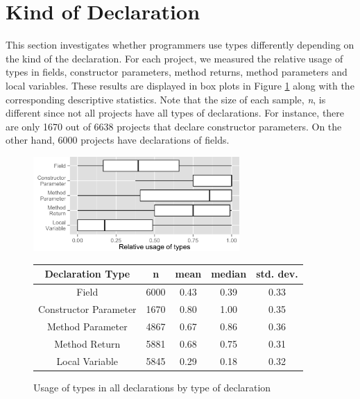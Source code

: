 \documentclass[msc]{ppgccufmg}
\renewcommand{\arraystretch}{1.2}
\begin{document}
\section{Kind of Declaration\label{sec:results-type}}
This section investigates whether programmers use types differently depending on the kind of the declaration.
For each project, we measured the relative usage of types in fields, constructor parameters, method returns, method parameters and local variables.
These results are displayed in box plots in Figure \ref{fig:all_boxplot_type} along with the corresponding descriptive statistics.
Note that the size of each sample, \emph{n}, is different since not all projects have all types of declarations. 
For instance, there are only 1670 out of 6638 projects that declare constructor parameters.
On the other hand, 6000 projects have declarations of fields.

\begin{figure}[h]
\centering 
\includegraphics[width=0.7\textwidth]{../aosd_2014/analysis/result/all/boxplots/6_declarations_by_type.png} 
\vspace{0.3cm}

\renewcommand{\arraystretch}{1.2}

\begin{tabular}{|c|c|c|c|c|}
\hline
Declaration Type		& n		& mean	& median		& std. dev.	\\
\hline
\hline
Field					& 6000	& 0.43	& 0.39		& 0.33		\\ \hline
Constructor Parameter	& 1670	& 0.80	& 1.00		& 0.35		\\ \hline
Method Parameter		& 4867	& 0.67	& 0.86		& 0.36		\\ \hline
Method Return			& 5881	& 0.68	& 0.75		& 0.31		\\ \hline
Local Variable			& 5845	& 0.29	& 0.18		& 0.32		\\ \hline
\end{tabular}

\caption{Usage of types in all declarations by type of declaration}
\label{fig:all_boxplot_type} 
\end{figure}
\end{document}
